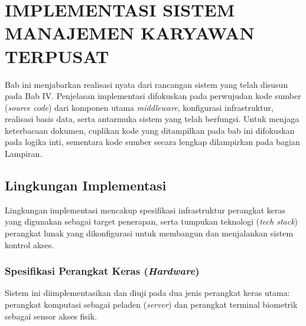 \cleardoublepage
\chapter{IMPLEMENTASI SISTEM MANAJEMEN KARYAWAN TERPUSAT}
\label{chap:implementasi}

Bab ini menjabarkan realisasi nyata dari rancangan sistem yang telah disusun pada Bab IV. Penjelasan implementasi difokuskan pada perwujudan kode sumber (\textit{source code}) dari komponen utama \textit{middleware}, konfigurasi infrastruktur, realisasi basis data, serta antarmuka sistem yang telah berfungsi. Untuk menjaga keterbacaan dokumen, cuplikan kode yang ditampilkan pada bab ini difokuskan pada logika inti, sementara kode sumber secara lengkap dilampirkan pada bagian Lampiran.

\section{Lingkungan Implementasi}
Lingkungan implementasi mencakup spesifikasi infrastruktur perangkat keras yang digunakan sebagai target penerapan, serta tumpukan teknologi (\textit{tech stack}) perangkat lunak yang dikonfigurasi untuk membangun dan menjalankan sistem kontrol akses.

\subsection{Spesifikasi Perangkat Keras (\textit{Hardware})}
Sistem ini diimplementasikan dan diuji pada dua jenis perangkat keras utama: perangkat komputasi sebagai peladen (\textit{server}) dan perangkat terminal biometrik sebagai sensor akses fisik.

